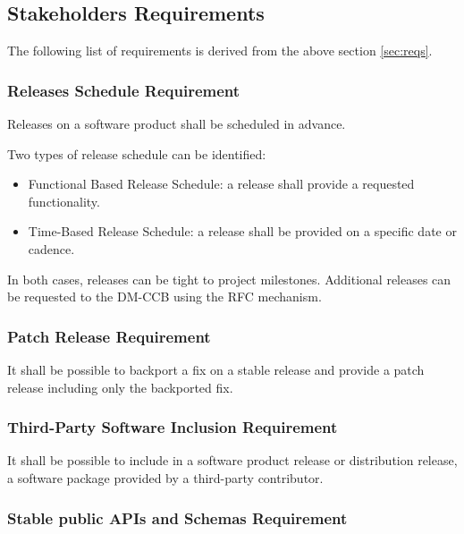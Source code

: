 \subsection{Stakeholders Requirements} \label{sec:stakeholdersreqs}

The following list of requirements is derived from the above section \ref{sec:reqs}.


\subsubsection{Releases Schedule Requirement} \label{sec:milestone}

Releases on a software product shall be scheduled in advance.

Two types of release schedule can be identified:

\begin{itemize}
\item Functional Based Release Schedule: a release shall provide a requested functionality.
\item Time-Based Release Schedule: a release shall be provided on a specific date or cadence.
\end{itemize}

In both cases, releases can be tight to project milestones.
Additional releases can be requested to the DM-CCB using the RFC mechanism.


\subsubsection{Patch Release Requirement} \label{sec:backport}

It shall be possible to backport a fix on a stable release and provide a patch release including only the backported fix.


\subsubsection{Third-Party Software Inclusion Requirement} \label{sec:thirdsw}

It shall be possible to include in a software product release or distribution release, a software package provided by a third-party contributor.


\subsubsection{Stable public APIs and Schemas Requirement} \label{sec:stable}

